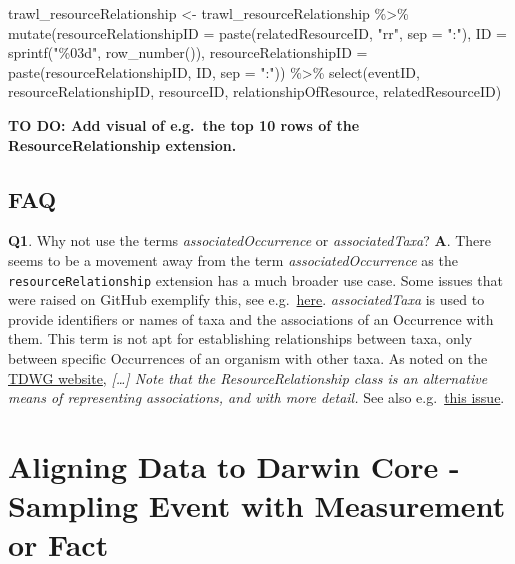 \documentclass[
]{book}
\newenvironment{Shaded}{\begin{snugshade}}{\end{snugshade}}
\newcommand{\AttributeTok}[1]{\textcolor[rgb]{0.77,0.63,0.00}{#1}}
\newcommand{\FunctionTok}[1]{\textcolor[rgb]{0.00,0.00,0.00}{#1}}
\newcommand{\NormalTok}[1]{#1}
\newcommand{\OtherTok}[1]{\textcolor[rgb]{0.56,0.35,0.01}{#1}}
\newcommand{\SpecialCharTok}[1]{\textcolor[rgb]{0.00,0.00,0.00}{#1}}
\newcommand{\StringTok}[1]{\textcolor[rgb]{0.31,0.60,0.02}{#1}}
\begin{document}
\begin{Shaded}
\begin{Highlighting}[]
\NormalTok{trawl\_resourceRelationship }\OtherTok{\textless{}{-}}\NormalTok{ trawl\_resourceRelationship }\SpecialCharTok{\%\textgreater{}\%}
  \FunctionTok{mutate}\NormalTok{(}\AttributeTok{resourceRelationshipID =} \FunctionTok{paste}\NormalTok{(relatedResourceID, }\StringTok{"rr"}\NormalTok{, }\AttributeTok{sep =} \StringTok{":"}\NormalTok{),}
         \AttributeTok{ID =} \FunctionTok{sprintf}\NormalTok{(}\StringTok{"\%03d"}\NormalTok{, }\FunctionTok{row\_number}\NormalTok{()),}
         \AttributeTok{resourceRelationshipID =} \FunctionTok{paste}\NormalTok{(resourceRelationshipID, ID, }\AttributeTok{sep =} \StringTok{":"}\NormalTok{)) }\SpecialCharTok{\%\textgreater{}\%}
  \FunctionTok{select}\NormalTok{(eventID, resourceRelationshipID, resourceID, relationshipOfResource, relatedResourceID)}
\end{Highlighting}
\end{Shaded}

\textbf{TO DO: Add visual of e.g.~the top 10 rows of the ResourceRelationship extension.}

\hypertarget{faq}{%
\subsection{FAQ}\label{faq}}

\textbf{Q1}. Why not use the terms \emph{associatedOccurrence} or \emph{associatedTaxa}?
\textbf{A}. There seems to be a movement away from the term \emph{associatedOccurrence} as the \texttt{resourceRelationship} extension has a much broader use case. Some issues that were raised on GitHub exemplify this, see e.g.~\href{https://github.com/tdwg/dwc/issues/324}{here}. \emph{associatedTaxa} is used to provide identifiers or names of taxa and the associations of an Occurrence with them. This term is not apt for establishing relationships between taxa, only between specific Occurrences of an organism with other taxa. As noted on the \href{https://dwc.tdwg.org/terms/\#dwc:associatedTaxa}{TDWG website}, \emph{{[}\ldots{]} Note that the ResourceRelationship class is an alternative means of representing associations, and with more detail.} See also e.g.~\href{https://github.com/tdwg/dwc/issues/331}{this issue}.

\hypertarget{aligning-data-to-darwin-core---sampling-event-with-measurement-or-fact}{%
\section{Aligning Data to Darwin Core - Sampling Event with Measurement or Fact}\label{aligning-data-to-darwin-core---sampling-event-with-measurement-or-fact}}
\end{document}
